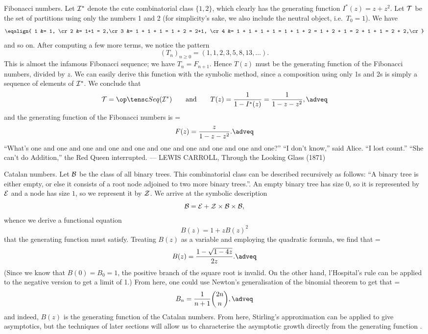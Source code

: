 \boldlabel Fibonacci numbers. Let ${\cal I}^*$ denote the cute combinatorial class $\{1,2\}$,
which clearly has the generating function $I^*(z) = z + z^2$. Let ${\cal T}$ be the set of partitions
using only the numbers 1 and 2 (for simplicity's sake, we also include the neutral object, i.e.\ $T_0=1$).
We have
$$\eqalign{
1 &= 1, \cr
2 &= 1+1 = 2,\cr
3 &= 1 + 1 + 1 = 1 + 2 = 2+1, \cr
4 &= 1 + 1 + 1 + 1 = 1 + 1 + 2 = 1 + 2 + 1 = 2 + 1 + 1 = 2 + 2,\cr
}$$
and so on. After computing a few more terms, we notice the pattern
$$(T_n)_{n\geq 0} = (1,1,2,3,5,8,13,\ldots).$$
This is almost the infamous Fibonacci sequence; we have $T_n = F_{n+1}$.
Hence $T(z)$ must be the generating function
of the Fibonacci numbers, divided by $z$.
We can easily derive this function with the symbolic method, since a composition
using only 1s and 2s is simply a sequence of elements of ${\cal I}^*$. We conclude that
$$\T = \Seq(\I^*)\qquad\hbox{and}\qquad T(z) = {1\over 1-I^*(z)} = {1\over 1-z-z^2},\adveq$$
and the generating function of the Fibonacci numbers is
\newcount\fibeq
\fibeq=\eqcount
$$F(z) = {z\over 1-z-z^2}.\adveq$$
\bigskip
{\obeylines\eightssi
\hfill ``What's one and one and one and one and one
\hfill and one and one and one and one and one?''
\hfill ``I don't know,'' said Alice. ``I lost count.''
\hfill ``She can't do Addition,'' the Red Queen interrupted.
\eightss
\smallskip
\hfill --- LEWIS CARROLL, {\eightssi Through the Looking Glass} (1871)}
\bigskip

\boldlabel Catalan numbers. Let ${\cal B}$ be the class of all binary trees. This combinatorial class
can be described recursively as follows: ``A binary tree is either empty, or else it consists of
a root node adjoined to two more binary trees.''. An empty binary tree has size 0, so it is represented
by ${\cal E}$ and a node has size $1$, so we represent it by ${\cal Z}$. We arrive at the symbolic description
$${\cal B} = {\cal E} + {\cal Z}\times{\cal B}\times{\cal B},$$
whence we derive a functional equation
$$B(z) = 1 + zB(z)^2$$
that the generating function must satisfy. Treating $B(z)$ as a variable and employing
the quadratic formula, we find that
\newcount\catalaneq
\catalaneq=\eqcount
$$B(z) = {1 - \sqrt{1-4z}\over 2z}.\adveq$$
(Since we know that $B(0) = B_0 = 1$, the positive branch of the square root is invalid.
On the other hand, l'Hospital's rule can be applied to the negative version to get a limit of 1.)
From here, one could use Newton's generalisation of the binomial theorem to get that
\newcount\catalanformula
\catalanformula=\eqcount
$$B_n = {1\over n+1}{2n\choose n},\adveq$$
and indeed, $B(z)$ is the generating function of the Catalan numbers. From here, Stirling's approximation
can be applied to give asymptotics, but the techniques of later sections will allow us to characterise
the asymptotic growth directly from the generating function .
\medskip

